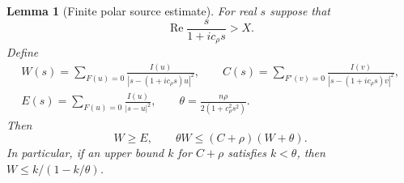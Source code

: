 \documentclass[11pt,reqno]{amsart}
\numberwithin{equation}{section}
\newtheorem{lemma}[theorem]{Lemma}
\theoremstyle{definition}
\theoremstyle{remark}
\renewcommand{\Re}{\operatorname{Re}}
\begin{document}
\begin{lemma}[Finite polar source estimate]\label{or:HB}
For real $s$ suppose that
\begin{equation}\label{or:Cayley-entrance}
             \Re\frac{s}{1+ic_\rho s}>X.
\end{equation}
Define
\begin{equation}\label{or:source-definitions}
 \begin{gathered}
 W(s)=\sum_{F(u)=0}\frac{I(u)}{|s-(1+ic_\rho s)u|^2},\qquad
 C(s)=\sum_{F'(v)=0}\frac{I(v)}{|s-(1+ic_\rho s)v|^2},\\
 E(s)=\sum_{F(u)=0}\frac{I(u)}{|s-u|^2},\qquad
 \theta=\frac{n\rho}{2(1+c_\rho^2s^2)}.
 \end{gathered}
\end{equation}
Then
\begin{equation}\label{or:HB-inequality}
         W\ge E,\qquad \theta W\le(C+\rho)(W+\theta).
\end{equation}
In particular, if an upper bound $k$ for $C+\rho$ satisfies $k<\theta$,
then $W\le k/(1-k/\theta)$.
\end{lemma}
\end{document}
